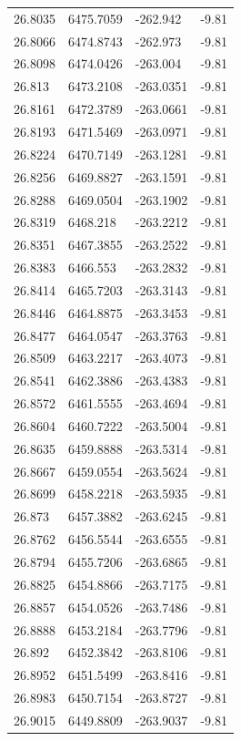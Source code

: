\begin{table}[H]
\begin{tabular}{llll}
26.8035 & 6475.7059 & -262.942 & -9.81 \\
26.8066 & 6474.8743 & -262.973 & -9.81 \\
26.8098 & 6474.0426 & -263.004 & -9.81 \\
26.813 & 6473.2108 & -263.0351 & -9.81 \\
26.8161 & 6472.3789 & -263.0661 & -9.81 \\
26.8193 & 6471.5469 & -263.0971 & -9.81 \\
26.8224 & 6470.7149 & -263.1281 & -9.81 \\
26.8256 & 6469.8827 & -263.1591 & -9.81 \\
26.8288 & 6469.0504 & -263.1902 & -9.81 \\
26.8319 & 6468.218 & -263.2212 & -9.81 \\
26.8351 & 6467.3855 & -263.2522 & -9.81 \\
26.8383 & 6466.553 & -263.2832 & -9.81 \\
26.8414 & 6465.7203 & -263.3143 & -9.81 \\
26.8446 & 6464.8875 & -263.3453 & -9.81 \\
26.8477 & 6464.0547 & -263.3763 & -9.81 \\
26.8509 & 6463.2217 & -263.4073 & -9.81 \\
26.8541 & 6462.3886 & -263.4383 & -9.81 \\
26.8572 & 6461.5555 & -263.4694 & -9.81 \\
26.8604 & 6460.7222 & -263.5004 & -9.81 \\
26.8635 & 6459.8888 & -263.5314 & -9.81 \\
26.8667 & 6459.0554 & -263.5624 & -9.81 \\
26.8699 & 6458.2218 & -263.5935 & -9.81 \\
26.873 & 6457.3882 & -263.6245 & -9.81 \\
26.8762 & 6456.5544 & -263.6555 & -9.81 \\
26.8794 & 6455.7206 & -263.6865 & -9.81 \\
26.8825 & 6454.8866 & -263.7175 & -9.81 \\
26.8857 & 6454.0526 & -263.7486 & -9.81 \\
26.8888 & 6453.2184 & -263.7796 & -9.81 \\
26.892 & 6452.3842 & -263.8106 & -9.81 \\
26.8952 & 6451.5499 & -263.8416 & -9.81 \\
26.8983 & 6450.7154 & -263.8727 & -9.81 \\
26.9015 & 6449.8809 & -263.9037 & -9.81 \\

\end{tabular}
\end{table}
